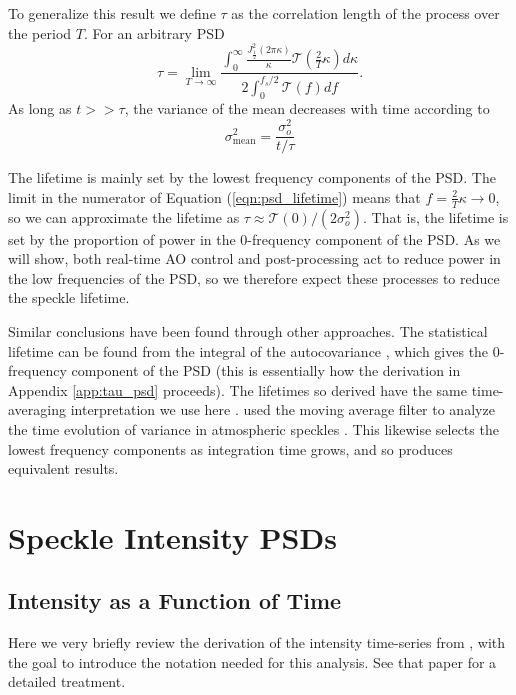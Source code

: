 \documentclass[10pt,preprint]{aastex631}
\begin{document}
To generalize this result we define $\tau$ as the correlation length of the process over the period $T$.  For an arbitrary PSD
\begin{equation}
\tau = \lim_{T\to\infty}\frac{ \displaystyle\int_0^{\infty} \frac{ J_{\frac{1}{2}}^2(2\pi \kappa)}{\kappa} \mathcal{T}\left( \frac{2}{T} \kappa \right) d\kappa}{ 2 \displaystyle\int_{0}^{f_s/2} \mathcal{T}(f) df}.
\label{eqn:psd_lifetime}
\end{equation}
As long as $t >> \tau$, the variance of the mean decreases with time according to
\begin{equation}
\sigma_\mathrm{mean}^2 =  \frac{\sigma_o^2}{t/\tau}
\end{equation}

The lifetime is mainly set by the lowest frequency components of the PSD.  The limit in the numerator of Equation (\ref{eqn:psd_lifetime}) means that $f = \frac{2}{T}\kappa \rightarrow 0$, so we can approximate the lifetime as $\tau \approx \mathcal{T}(0)/(2\sigma_o^2)$.  That is, the lifetime is set by the proportion of power in the 0-frequency component of the PSD.  As we will show, both real-time AO control and post-processing act to reduce power in the low frequencies of the PSD, so we therefore expect these processes to reduce the speckle lifetime.

Similar conclusions have been found through other approaches.  The statistical lifetime can be found from the integral of the autocovariance \citep{1986JOSAA...3.1001A}, which gives the 0-frequency component of the PSD (this is essentially how the derivation in Appendix \ref{app:tau_psd} proceeds).  The lifetimes so derived have the same time-averaging interpretation we use here \citep{2006ApJ...637..541F}.  \citet{2006OExpr..14.7499P} used the moving average filter to analyze the time evolution of variance in atmospheric speckles \citep[see also][]{2005SPIE.5903..170M}.  This likewise selects the lowest frequency components as integration time grows, and so produces equivalent results.

\section{Speckle Intensity PSDs}

\subsection{Intensity as a Function of Time}
Here we very briefly review the derivation of the intensity time-series from \citet{2018JATIS...4a9001M}, with the goal to introduce the notation needed for this analysis.  See that paper for a detailed treatment.
\end{document}
